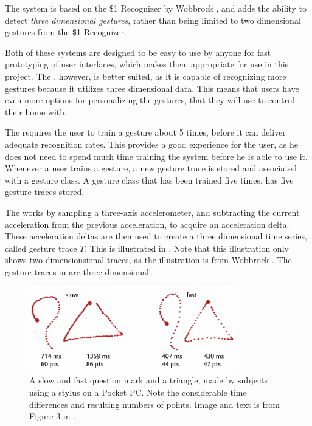 The system is based on the \$1 Recognizer by Wobbrock \etal \cite{wobbrock2007gestures}, 
and adds the ability to detect \emph{three dimensional gestures}, 
rather than being limited to two dimensional gestures from the \$1 Recognizer.

Both of these systems are designed to be easy to use by anyone for fast prototyping of user interfaces, 
which makes them appropriate for use in this project.
The \threedollar, however, is better suited, 
as it is capable of recognizing more gestures because it utilizes three dimensional data.
This means that users have even more options for personalizing the gestures, 
that they will use to control their home with.

The \threedollar requires the user to train a gesture about \num{5} times, 
before it can deliver adequate recognition rates. 
This provides a good experience for the user, 
as he does not need to spend much time training the system before he is able to use it.
Whenever a user trains a gesture, 
a new gesture trace is stored and associated with a gesture class. 
A gesture class that has been trained five times, 
has five gesture traces stored.

The \threedollar works by sampling a three-axis accelerometer, 
and subtracting the current acceleration from the previous acceleration, 
to acquire an acceleration delta.
These acceleration deltas are then used to create a three dimensional time series, 
called gesture trace $T$.
This is illustrated in . 
Note that this illustration only shows two-dimensionsional traces, 
as the illustration is from Wobbrock \etal \cite{wobbrock2007gestures}.
The gesture traces in \cite{threedollar} are three-dimensional. 

\begin{figure}[!htb]
	\centering
	\includegraphics[width=0.8\textwidth]{images/1-dollar-gesturetrace.png}
	\caption{A slow and fast question mark and a triangle, made by subjects using a stylus on a Pocket PC. Note the considerable time differences and resulting numbers of points. Image and text is from Figure 3 in \protect\cite{wobbrock2007gestures}.}
	\label{fig:onedollar-gesturetrace}
\end{figure}

